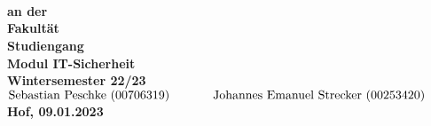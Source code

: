 \begin{titlepage}
        \center
        \textbf{\Large \mytitle}\\[0.5cm]
        \textbf{\large \mysubtitle}\\[0.5cm]

    \vspace{3cm}
    \textbf{\Large \textls{\mydoctype}}\\[0.8cm]
    \textbf{an der \myuniname\\
    Fakultät \myfaculty\\
    Studiengang \mycourse\\
    Modul IT-Sicherheit\\
    Wintersemester 22/23}\\[0.5cm]
%
    $\text{Sebastian Peschke (00706319) \hspace{1cm} Johannes Emanuel Strecker (00253420)}$\\
    \vfill
    \textbf{Hof, 09.01.2023}
    \vfill
    
    
\end{titlepage}
\restoregeometry